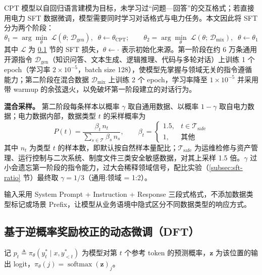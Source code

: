 \documentclass[fontset=fandol,type=master,campus=shenzhen,etitleauto=true]{hithesisbook}
\begin{document}
CPT 模型以自回归语言建模为目标，未学习过“问题—回答”的交互格式；若直接用电力 SFT 数据微调，模型需要同时学习对话格式与电力任务。本文因此将 SFT 分为两个阶段：
\begin{equation}\label{eq:sft-stage}
\theta_1 = \arg\min_{\theta} \; \mathcal{L}(\theta;\, \mathcal{D}_{\text{gen}}), \;\; \theta \leftarrow \theta_{\text{CPT}}; \qquad
\theta_2 = \arg\min_{\theta} \; \mathcal{L}(\theta;\, \mathcal{D}_{\text{mix}}), \;\; \theta \leftarrow \theta_1
\end{equation}
其中 $\mathcal{L}$ 为 \ref{ux8badux7ec3ux914dux7f6eux4e0eux4f18ux5316} 节的 SFT 损失，$\theta \leftarrow \cdot$ 表示初始化来源。第一阶段在约 6 万条通用开源指令 $\mathcal{D}_{\text{gen}}$（知识问答、文本生成、逻辑推理、代码与多轮对话）上训练 1 个 epoch（学习率 $2 \times 10^{-5}$，batch size 128），使模型先掌握与领域无关的指令遵循能力；第二阶段在混合数据 $\mathcal{D}_{\text{mix}}$ 上训练 2 个 epoch，学习率降至 $1 \times 10^{-5}$ 并采用带 warmup 的余弦退火，以免破坏第一阶段建立的对话行为。

\textbf{混合采样。} 第二阶段每条样本以概率 $\gamma$ 取自通用数据、以概率 $1 - \gamma$ 取自电力数据；电力数据内部，数据类型 $t$ 的采样概率为
\begin{equation}\label{eq:sft-sampling}
P(t) = \frac{\beta_t\, n_t}{\sum_{s \in \mathcal{T}} \beta_s\, n_s}, \qquad
\beta_t = \begin{cases} 1.5, & t \in \mathcal{T}_{\text{safe}} \\ 1, & \text{其他} \end{cases}
\end{equation}
其中 $n_t$ 为类型 $t$ 的样本数，即默认按自然样本量配比；$\mathcal{T}_{\text{safe}}$ 为运维检修与资产管理、运行控制与二次系统、制度文件三类安全敏感数据，对其上采样 1.5 倍。$\gamma$ 过小会遗忘第一阶段的指令能力，过大会稀释领域信号，配比实验（\ref{subsec:sft-ratio} 节）最终取 $\gamma = 1/3$（通用:领域 = 1:2）。

输入采用 System Prompt + Instruction + Response 三段式格式，不添加数据类型标记或场景 Prefix，让模型从业务语境中隐式区分不同数据类型的响应方式。

\subsection{基于逆概率奖励校正的动态微调（DFT）}\label{ux8badux7ec3ux914dux7f6eux4e0eux4f18ux5316}

记 $p_t \triangleq \pi_\theta(y_t^* \mid x, y_{<t}^*)$ 为模型对第 $t$ 个参考 token 的预测概率，$\mathbf{z}$ 为该位置的输出 logit，$\pi_\theta(j) = \operatorname{softmax}(\mathbf{z})_j$。
\end{document}
